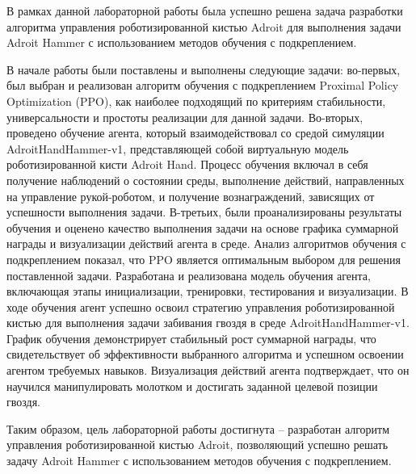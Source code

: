 
В рамках данной лабораторной работы была успешно решена задача разработки алгоритма управления роботизированной кистью Adroit 
для выполнения задачи Adroit Hammer с использованием методов обучения с подкреплением. 

В начале работы были поставлены и выполнены следующие задачи: во-первых, был выбран и реализован алгоритм обучения 
с подкреплением Proximal Policy Optimization (PPO), как наиболее подходящий по критериям стабильности, 
универсальности и простоты реализации для данной задачи. 
Во-вторых, проведено обучение агента, который взаимодействовал со средой симуляции AdroitHandHammer-v1, 
представляющей собой виртуальную модель роботизированной кисти Adroit Hand. 
Процесс обучения включал в себя получение наблюдений о состоянии среды, выполнение действий, 
направленных на управление рукой-роботом, и получение вознаграждений, зависящих от успешности выполнения задачи. 
В-третьих, были проанализированы результаты обучения и оценено качество выполнения задачи на основе графика суммарной 
награды и визуализации действий агента в среде. Анализ алгоритмов обучения с подкреплением показал, 
что PPO является оптимальным выбором для решения поставленной задачи. 
Разработана и реализована модель обучения агента, включающая этапы инициализации, тренировки, тестирования и визуализации. 
В ходе обучения агент успешно освоил стратегию управления роботизированной кистью для выполнения задачи забивания гвоздя в среде AdroitHandHammer-v1. 
График обучения демонстрирует стабильный рост суммарной награды, что свидетельствует об эффективности выбранного алгоритма и успешном освоении агентом требуемых навыков. 
Визуализация действий агента подтверждает, что он научился манипулировать молотком и достигать заданной целевой позиции гвоздя. 

Таким образом, цель лабораторной работы достигнута – разработан алгоритм управления роботизированной кистью Adroit, 
позволяющий успешно решать задачу Adroit Hammer с использованием методов обучения с подкреплением. 
